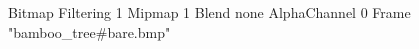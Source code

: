 {Bitmap
	{Filtering 1}
	{Mipmap 1}
	{Blend none}
	{AlphaChannel 0}
	{Frame "bamboo_tree#bare.bmp"}
}
